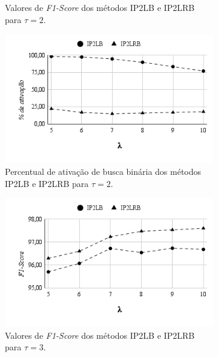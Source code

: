 \begin{figure}[h]
\begin{subfigure}[b]{0.49\textwidth}
        \caption{Valores de \textit{F1-Score} dos métodos IP2LB e IP2LRB para $\tau=2$.}
        \label{fig:f1_score_tau_2}
    \end{subfigure}
    \begin{subfigure}[b]{0.49\textwidth}
        \includegraphics[width=\textwidth]{figures/binary-activation-tau-2.png}
        \caption{Percentual de ativação de busca binária dos métodos IP2LB e IP2LRB para $\tau=2$.}
        \label{fig:binary_activation_tau_2}
    \end{subfigure}
    \begin{subfigure}[b]{0.49\textwidth}
        \includegraphics[width=\textwidth]{figures/f1-score-tau-3.png}
        \caption{Valores de \textit{F1-Score} dos métodos IP2LB e IP2LRB para $\tau=3$.}
        \label{fig:f1_score_tau_3}
    \end{subfigure}
    \begin{subfigure}[b]{0.49\textwidth}

\end{subfigure}
\end{figure}
